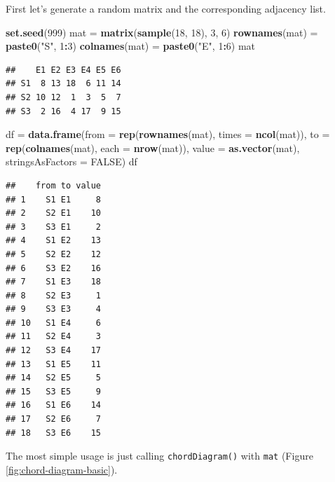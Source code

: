 \documentclass[]{book}
\newenvironment{Shaded}{\begin{snugshade}}{\end{snugshade}}
\newcommand{\KeywordTok}[1]{\textcolor[rgb]{0.13,0.29,0.53}{\textbf{#1}}}
\newcommand{\DataTypeTok}[1]{\textcolor[rgb]{0.13,0.29,0.53}{#1}}
\newcommand{\DecValTok}[1]{\textcolor[rgb]{0.00,0.00,0.81}{#1}}
\newcommand{\StringTok}[1]{\textcolor[rgb]{0.31,0.60,0.02}{#1}}
\newcommand{\OtherTok}[1]{\textcolor[rgb]{0.56,0.35,0.01}{#1}}
\newcommand{\OperatorTok}[1]{\textcolor[rgb]{0.81,0.36,0.00}{\textbf{#1}}}
\newcommand{\NormalTok}[1]{#1}
\theoremstyle{definition}
\theoremstyle{definition}
\theoremstyle{remark}
\begin{document}
First let's generate a random matrix and the corresponding adjacency
list.

\begin{Shaded}
\begin{Highlighting}[]
\KeywordTok{set.seed}\NormalTok{(}\DecValTok{999}\NormalTok{)}
\NormalTok{mat =}\StringTok{ }\KeywordTok{matrix}\NormalTok{(}\KeywordTok{sample}\NormalTok{(}\DecValTok{18}\NormalTok{, }\DecValTok{18}\NormalTok{), }\DecValTok{3}\NormalTok{, }\DecValTok{6}\NormalTok{) }
\KeywordTok{rownames}\NormalTok{(mat) =}\StringTok{ }\KeywordTok{paste0}\NormalTok{(}\StringTok{"S"}\NormalTok{, }\DecValTok{1}\OperatorTok{:}\DecValTok{3}\NormalTok{)}
\KeywordTok{colnames}\NormalTok{(mat) =}\StringTok{ }\KeywordTok{paste0}\NormalTok{(}\StringTok{"E"}\NormalTok{, }\DecValTok{1}\OperatorTok{:}\DecValTok{6}\NormalTok{)}
\NormalTok{mat}
\end{Highlighting}
\end{Shaded}

\begin{verbatim}
##    E1 E2 E3 E4 E5 E6
## S1  8 13 18  6 11 14
## S2 10 12  1  3  5  7
## S3  2 16  4 17  9 15
\end{verbatim}

\begin{Shaded}
\begin{Highlighting}[]
\NormalTok{df =}\StringTok{ }\KeywordTok{data.frame}\NormalTok{(}\DataTypeTok{from =} \KeywordTok{rep}\NormalTok{(}\KeywordTok{rownames}\NormalTok{(mat), }\DataTypeTok{times =} \KeywordTok{ncol}\NormalTok{(mat)),}
    \DataTypeTok{to =} \KeywordTok{rep}\NormalTok{(}\KeywordTok{colnames}\NormalTok{(mat), }\DataTypeTok{each =} \KeywordTok{nrow}\NormalTok{(mat)),}
    \DataTypeTok{value =} \KeywordTok{as.vector}\NormalTok{(mat),}
    \DataTypeTok{stringsAsFactors =} \OtherTok{FALSE}\NormalTok{)}
\NormalTok{df}
\end{Highlighting}
\end{Shaded}

\begin{verbatim}
##    from to value
## 1    S1 E1     8
## 2    S2 E1    10
## 3    S3 E1     2
## 4    S1 E2    13
## 5    S2 E2    12
## 6    S3 E2    16
## 7    S1 E3    18
## 8    S2 E3     1
## 9    S3 E3     4
## 10   S1 E4     6
## 11   S2 E4     3
## 12   S3 E4    17
## 13   S1 E5    11
## 14   S2 E5     5
## 15   S3 E5     9
## 16   S1 E6    14
## 17   S2 E6     7
## 18   S3 E6    15
\end{verbatim}

The most simple usage is just calling \texttt{chordDiagram()} with
\texttt{mat} (Figure \ref{fig:chord-diagram-basic}).
\end{document}

